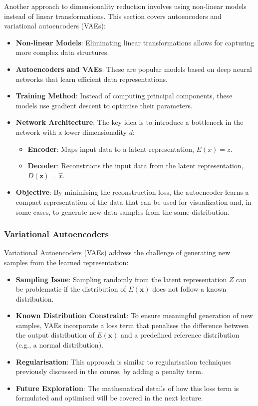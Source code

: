 Another approach to dimensionality reduction involves using non-linear models instead of linear transformations. This section covers autoencoders and variational autoencoders (VAEs):
\begin{itemize}
    \item \textbf{Non-linear Models}: Eliminating linear transformations allows for capturing more complex data structures.
    \item \textbf{Autoencoders and VAEs}: These are popular models based on deep neural networks that learn efficient data representations.
    \item \textbf{Training Method}: Instead of computing principal components, these models use gradient descent to optimise their parameters.
    \item \textbf{Network Architecture}: The key idea is to introduce a bottleneck in the network with a lower dimensionality $d$:
          \begin{itemize}
              \item \textbf{Encoder}: Maps input data to a latent representation, $E(x) = z$.
              \item \textbf{Decoder}: Reconstructs the input data from the latent representation, $D(\boldsymbol{z}) = \hat{x}$.
          \end{itemize}
    \item \textbf{Objective}: By minimising the reconstruction loss, the autoencoder learns a compact representation of the data that can be used for visualization and, in some cases, to generate new data samples from the same distribution.
\end{itemize}

\subsubsection{Variational Autoencoders}

Variational Autoencoders (VAEs) address the challenge of generating new samples from the learned representation:
\begin{itemize}
    \item \textbf{Sampling Issue}: Sampling randomly from the latent representation $Z$ can be problematic if the distribution of $E(\boldsymbol{x})$ does not follow a known distribution.
    \item \textbf{Known Distribution Constraint}: To ensure meaningful generation of new samples, VAEs incorporate a loss term that penalises the difference between the output distribution of $E(\boldsymbol{x})$ and a predefined reference distribution (e.g., a normal distribution).
    \item \textbf{Regularisation}: This approach is similar to regularisation techniques previously discussed in the course, by adding a penalty term.
    \item \textbf{Future Exploration}: The mathematical details of how this loss term is formulated and optimised will be covered in the next lecture.
\end{itemize}
